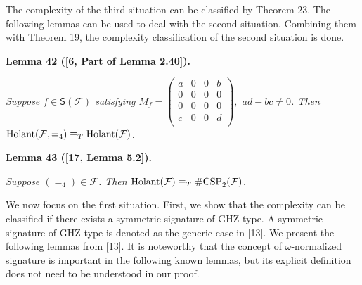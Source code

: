 


The complexity of the third situation can be classified by Theorem 23. The following lemmas can be used to deal with the second situation. Combining them with Theorem 19, the complexity classification of the second situation is done.\par





\par\medskip\noindent\textbf{
\textbf{Lemma 42}\textbf{ }([6, Part of Lemma 2.40])\textbf{.}
}\par



\emph{Suppose $f\in\textsf{S}(\mathcal{F})$ satisfying $M_{f}=\begin{pmatrix}a&0&0&b\\
0&0&0&0\\
0&0&0&0\\
c&0&0&d\\
\end{pmatrix},$ $ad-bc\neq 0$. Then $\textup{{Holant}}(\mathcal{F},=_{4})\equiv_{T}\textup{{Holant}}(\mathcal{F})$.}\par







\par\medskip\noindent\textbf{
\textbf{Lemma 43}\textbf{ }([17, Lemma 5.2])\textbf{.}
}\par



\emph{Suppose $(=_{4})\in\mathcal{F}$. Then $\textup{{Holant}}(\mathcal{F})\equiv_{T}\textup{{\#CSP}}_{2}(\mathcal{F})$.}\par






We now focus on the first situation. First, we show that the complexity can be classified if there exists a symmetric signature of GHZ type.
A symmetric signature of GHZ type is denoted as the generic case in [13]. We present the following lemmas from [13]. It is noteworthy that the concept of $\omega$-normalized signature is important in the following known lemmas, but its explicit definition does not need to be understood in our proof.\par



